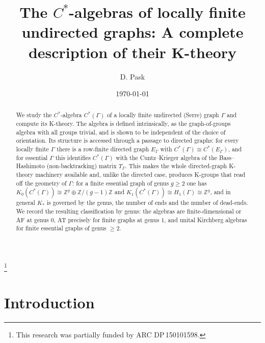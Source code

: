 \documentclass[12pt,reqno]{amsart}
\theoremstyle{plain}
\theoremstyle{definition}
\newcommand{\Z}{\mathbb{Z}}
\begin{document}
\title[$C^*$-algebras of locally finite undirected graphs: K-theory]{The $C^*$-algebras of
locally finite undirected graphs: A complete description of their K-theory}

\author{D. Pask}
\address{College of Science and Engineering, James Cook University, Townsville QLD 4811, Australia}
\date{\today}

\thanks{This research was partially funded by ARC DP\,150101598.}

\begin{abstract}
We study the $C^*$-algebra $C^*(\Gamma)$ of a locally finite undirected (Serre) graph $\Gamma$ and compute its
K-theory. The algebra is defined intrinsically, as the graph-of-groups algebra with all groups
trivial, and is shown to be independent of the choice of orientation. Its structure is accessed
through a passage to directed graphs: for every locally finite $\Gamma$ there is a row-finite
directed graph $E_\Gamma$ with $C^*(\Gamma)\cong C^*(E_\Gamma)$, and for essential $\Gamma$ this
identifies $C^*(\Gamma)$ with the Cuntz--Krieger algebra of the Bass--Hashimoto (non-backtracking)
matrix $T_\Gamma$. This makes the whole directed-graph K-theory machinery available and, unlike the
directed case, produces K-groups that read off the geometry of $\Gamma$: for a finite essential graph
of genus $g\ge 2$ one has $K_0(C^*(\Gamma))\cong\Z^{g}\oplus\Z/(g-1)\Z$ and
$K_1(C^*(\Gamma))\cong H_1(\Gamma)\cong\Z^{g}$, and in general $K_\ast$ is governed by the genus, the
number of ends and the number of dead-ends. We record the resulting classification by genus: the algebras are finite-dimensional or AF at genus
$0$, AT precisely for finite graphs at genus $1$, and unital Kirchberg algebras for finite essential
graphs of genus $\ge 2$.
\end{abstract}

\maketitle

\section{Introduction}\label{sec:intro}
\end{document}
